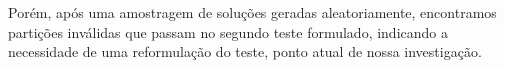 \documentclass[
	article,			%
	11pt,				%
	oneside,			%
	a4paper,			%
	english,			%
	brazil,				%
	sumario=tradicional
	]{abntex2}
\begin{document}
Porém, após uma amostragem de soluções geradas aleatoriamente, encontramos partições inválidas que passam no segundo teste formulado, indicando a necessidade de uma reformulação do teste, ponto atual de nossa investigação.











\pagebreak
% 


\postextual




\end{document}
